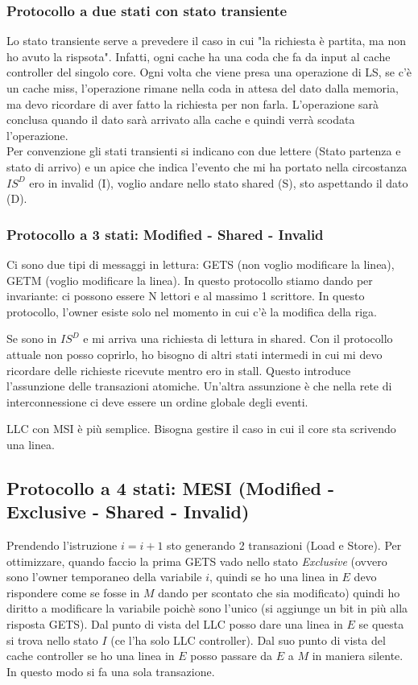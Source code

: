 \documentclass{article}
\begin{document}
\subsubsection{Protocollo a due stati con stato transiente}
Lo stato transiente serve a prevedere il caso in cui "la richiesta è partita, ma non ho avuto la rispsota". Infatti, ogni cache ha una coda che fa da input al cache
controller del singolo core. Ogni volta che viene presa una operazione di LS, se c'è un cache miss, l'operazione rimane nella coda in attesa del dato dalla memoria, ma devo ricordare di 
aver fatto la richiesta per non farla. L'operazione sarà conclusa quando il dato sarà arrivato alla cache e quindi verrà scodata l'operazione.\\

Per convenzione gli stati transienti si indicano con due lettere (Stato partenza e stato di arrivo) e un apice che indica l'evento che mi ha portato nella circostanza $IS^D$
ero in invalid (I), voglio andare nello stato shared (S), sto aspettando il dato (D).

\subsubsection{Protocollo a 3 stati: Modified - Shared - Invalid}
Ci sono due tipi di messaggi in lettura: GETS (non voglio modificare la linea), GETM (voglio modificare la linea). In questo protocollo stiamo dando per invariante: ci possono
essere N lettori e al massimo 1 scrittore. In questo protocollo, l'owner esiste solo nel momento in cui c'è la modifica della riga.

Se sono in $IS^D$ e mi arriva una richiesta di lettura in shared. Con il protocollo attuale non posso coprirlo, ho bisogno di altri stati intermedi
in cui mi devo ricordare delle richieste ricevute mentro ero in stall. Questo introduce l'assunzione delle transazioni atomiche.
Un'altra assunzione è che nella rete di interconnessione ci deve essere un ordine globale degli eventi.

LLC con MSI è più semplice. Bisogna gestire il caso in cui il core sta scrivendo una linea.

\subsection{Protocollo a 4 stati: MESI (Modified - Exclusive - Shared - Invalid)}
Prendendo l'istruzione $i = i + 1$ sto generando 2 transazioni (Load e Store). Per ottimizzare, quando faccio la prima GETS vado nello stato
\textit{Exclusive} (ovvero sono l'owner temporaneo della variabile $i$, quindi se ho una linea in $E$ devo rispondere come se fosse in $M$
dando per scontato che sia modificato) quindi ho diritto a modificare la variabile poichè sono l'unico (si aggiunge un bit in più alla risposta GETS). 
Dal punto di vista del LLC posso dare una linea in $E$ se questa si trova nello stato $I$ (ce l'ha solo LLC controller). 
Dal suo punto di vista del cache controller se ho una linea in $E$ posso passare da $E$ a $M$ in maniera silente. In questo modo si fa una sola transazione.
\end{document}
